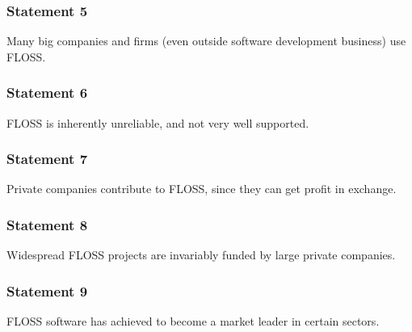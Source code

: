 \documentclass{beamer}
\begin{document}
\begin{frame}
 \frametitle{Statement 5}
 \begin{center}
  \begin{LARGE} Many big companies and firms (even outside software development business) use FLOSS. \end{LARGE}
 \end{center}

\end{frame}


\begin{frame}
 \frametitle{Statement 6}
 \begin{center}
  \begin{LARGE} FLOSS is inherently unreliable, and not very well supported. \end{LARGE}
 \end{center}

\end{frame}


\begin{frame}
 \frametitle{Statement 7}
 \begin{center}
  \begin{LARGE} Private companies contribute to FLOSS, since they can get profit in exchange. \end{LARGE}
 \end{center}

\end{frame}


\begin{frame}
 \frametitle{Statement 8}
 \begin{center}
  \begin{LARGE} Widespread FLOSS projects are invariably funded by large private companies. \end{LARGE}
 \end{center}

\end{frame}


\begin{frame}
 \frametitle{Statement 9}
 \begin{center}
  \begin{LARGE} FLOSS software has achieved to become a market leader in certain sectors.  \end{LARGE}
 \end{center}

\end{frame}
\end{document}
